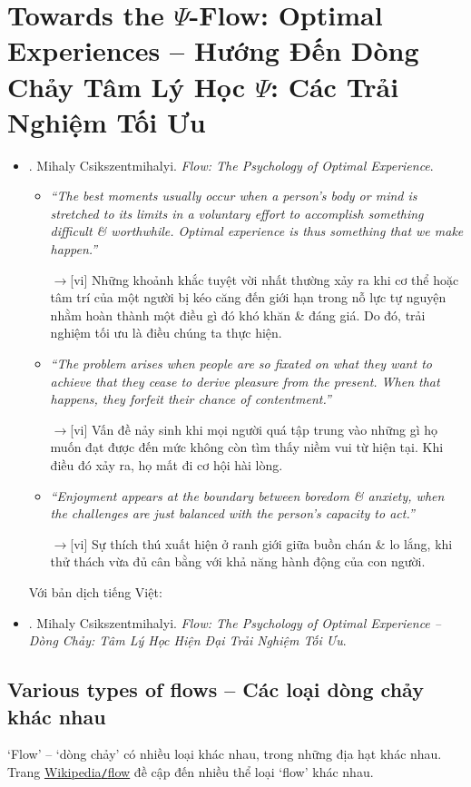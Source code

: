 \documentclass[12pt,twoside]{book}
\begin{document}
\chapter{Towards the $\Psi$-Flow: Optimal Experiences -- Hướng Đến Dòng Chảy Tâm Lý Học $\Psi$: Các Trải Nghiệm Tối Ưu}
\minitoc
{}
\begin{itemize}
	\item \cite{Csikszentmihalyi_flow}. {\sc Mihaly Csikszentmihalyi}. {\it Flow: The Psychology of Optimal Experience}.
	\begin{itemize}
		\item {\it``The best moments usually occur when a person's body or mind is stretched to its limits in a voluntary effort to accomplish something difficult \& worthwhile. Optimal experience is thus something that we make happen.''}
		
		{\sf[en]$\to$[vi]} Những khoảnh khắc tuyệt vời nhất thường xảy ra khi cơ thể hoặc tâm trí của một người bị kéo căng đến giới hạn trong nỗ lực tự nguyện nhằm hoàn thành một điều gì đó khó khăn \& đáng giá. Do đó, trải nghiệm tối ưu là điều chúng ta thực hiện.
		
		\item {\it``The problem arises when people are so fixated on what they want to achieve that they cease to derive pleasure from the present. When that happens, they forfeit their chance of contentment.''}
		
		{\sf[en]$\to$[vi]} Vấn đề nảy sinh khi mọi người quá tập trung vào những gì họ muốn đạt được đến mức không còn tìm thấy niềm vui từ hiện tại. Khi điều đó xảy ra, họ mất đi cơ hội hài lòng.
		
		\item {\it``Enjoyment appears at the boundary between boredom \& anxiety, when the challenges are just balanced with the person's capacity to act.''}
		
		{\sf[en]$\to$[vi]} Sự thích thú xuất hiện ở ranh giới giữa buồn chán \& lo lắng, khi thử thách vừa đủ cân bằng với khả năng hành động của con người.		
	\end{itemize}
	Với bản dịch tiếng Việt:
	\item \cite{Csikszentmihalyi_flow_VN}. {\sc Mihaly Csikszentmihalyi}. {\it Flow: The Psychology of Optimal Experience -- Dòng Chảy: Tâm Lý Học Hiện Đại Trải Nghiệm Tối Ưu}.
\end{itemize}

\section{Various types of flows -- Các loại dòng chảy khác nhau}
`Flow' -- `dòng chảy' có nhiều loại khác nhau, trong những địa hạt khác nhau. Trang \href{https://en.wikipedia.org/wiki/Flow}{Wikipedia{\tt/}flow} đề cập đến nhiều thể loại `flow' khác nhau.
\end{document}
